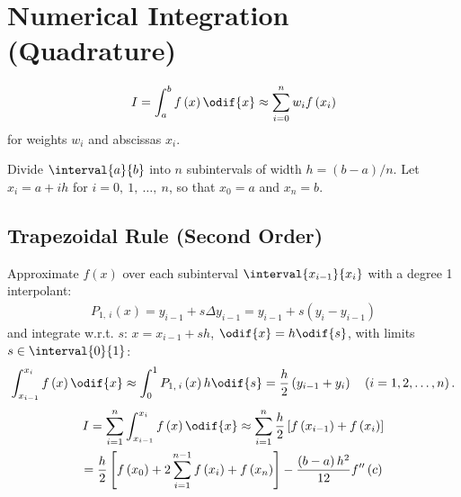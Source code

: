 \documentclass{article}
\begin{document}
\begin{minipage}[t]{126.1962963mm}
    \section{Numerical Integration (Quadrature)}
    \begin{equation*}
        I = \int_a^b f\left( x \right) \odif{x} \approx \sum_{i = 0}^n w_i f\left( x_i \right)
    \end{equation*}
    for weights \(w_i\) and abscissas \(x_i\).

    Divide \(\interval{a}{b}\) into \(n\) subintervals of width \(h = \left( b - a \right) / n\).
    Let \(x_i = a + i h\) for \(i = 0,\: 1,\: \ldots,\: n\), so that \(x_0 = a\) and \(x_n = b\).
    \subsection{Trapezoidal Rule (Second Order)}
    Approximate \(f\left( x \right)\) over each subinterval \(\interval{x_{i - 1}}{x_i}\) with a degree 1 interpolant:
    \begin{align*}
        P_{1,\: i}\left( x \right) = y_{i - 1} + s \Delta{y_{i - 1}} = y_{i - 1} + s \left( y_i - y_{i - 1} \right)
    \end{align*}
    and integrate w.r.t. \(s\): \(x = x_{i - 1} + s h\), \(\odif{x} = h \odif{s}\), with limits \(s \in \interval{0}{1}\):
    \begin{align*}
        \int_{x_{i - 1}}^{x_i} f\left( x \right) \odif{x} \approx \int_0^1 P_{1,\: i}\left( x \right) h \odif{s} = \frac{h}{2} \left( y_{i - 1} + y_i \right) \quad \left(i = 1, 2, \ldots, n\right).
    \end{align*}
    \begin{multline*}
        I = \sum_{i = 1}^n \int_{x_{i-1}}^{x_i} f\left( x \right) \odif{x} \approx \sum_{i = 1}^n \frac{h}{2} \left[ f\left( x_{i - 1} \right) + f\left( x_i \right) \right]                                                                           \\
        = \frac{h}{2} \left[ f\left( x_0 \right) + 2 \sum_{i = 1}^{n - 1} f\left( x_i \right) + f\left( x_n \right) \right] -\frac{\left( b - a \right)h^2}{12} f''\left( c \right)
    \end{multline*}

\end{minipage}
\end{document}
